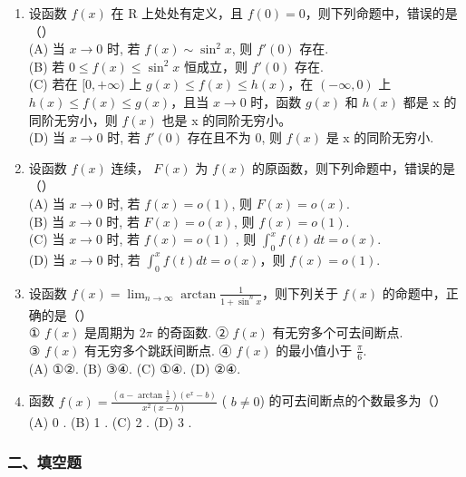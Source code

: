 \documentclass[12pt, a4paper]{ctexart}
\begin{document}
\begin{enumerate}
    \item 设函数 $ f(x) $ 在 R 上处处有定义，且 $ f(0) = 0 $，则下列命题中，错误的是（）\\
    (A) 当 $ x \to 0 $ 时, 若 $ f(x) \sim \sin^{2} x $, 则 $ f'(0) $ 存在.\\
    (B) 若 $ 0 \leq f(x) \leq \sin^{2} x $ 恒成立，则 $ f'(0) $ 存在.\\
    (C) 若在 $ [0,+\infty) $ 上 $ g(x) \leq f(x) \leq h(x) $，在 $ (-\infty,0) $ 上 $ h(x) \leq f(x) \leq g(x) $，且当 $ x \to 0 $ 时，函数 $ g(x) $ 和 $ h(x) $ 都是 x 的同阶无穷小，则 $ f(x) $ 也是 x 的同阶无穷小。\\
    (D) 当 $ x \to 0 $ 时, 若 $ f'(0) $ 存在且不为 0, 则 $ f(x) $ 是 x 的同阶无穷小.

    \item 设函数 $ f(x) $ 连续， $ F(x) $ 为 $ f(x) $ 的原函数，则下列命题中，错误的是（）\\
    (A) 当 $ x \to 0 $ 时, 若 $ f(x) = o(1) $, 则 $ F(x) = o(x) $.\\
    (B) 当 $ x \to 0 $ 时, 若 $ F(x) = o(x) $, 则 $ f(x) = o(1) $.\\
    (C) 当 $ x \to 0 $ 时, 若 $ f(x) = o(1) $ , 则 $ \int_{0}^{x} f(t) \, dt = o(x) $.\\
    (D) 当 $ x \to 0 $ 时, 若 $ \int_{0}^{x} f(t) dt = o(x) $，则 $ f(x) = o(1) $.

    \item 设函数 $ f(x)=\lim_{n\to\infty}\arctan\frac{1}{1+\sin^n x} $，则下列关于 $ f(x) $ 的命题中，正确的是（）\\
    ① $ f(x) $ 是周期为 $ 2\pi $ 的奇函数. ② $ f(x) $ 有无穷多个可去间断点.\\
    ③ $ f(x) $ 有无穷多个跳跃间断点. ④ $ f(x) $ 的最小值小于 $ \frac{\pi}{6} $.\\
    (A) ①②. \quad (B) ③④. \quad (C) ①④. \quad (D) ②④.

    \item 函数 $ f(x)=\frac{\left(a-\arctan\frac{1}{x}\right)\left(\mathrm{e}^{x}-b\right)}{x^{2}(x-b)} $ ( $ b\neq0 $) 的可去间断点的个数最多为（）\\
    (A) 0 . \quad (B) 1 . \quad (C) 2 . \quad (D) 3 .
\end{enumerate}

\subsubsection*{二、填空题}
\end{document}
